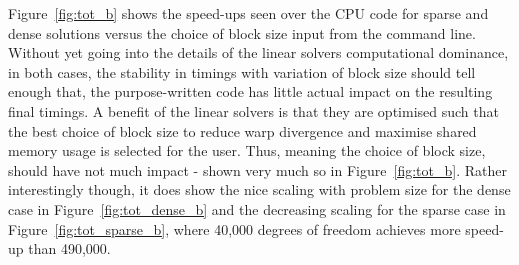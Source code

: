Figure~\ref{fig:tot_b} shows the speed-ups seen over the CPU code for sparse and dense solutions versus the choice of block size input from the command line. Without yet going into the details of the linear solvers computational dominance, in both cases, the stability in timings with variation of block size should tell enough that, the purpose-written code has little actual impact on the resulting final timings. A benefit of the linear solvers is that they are optimised such that the best choice of block size to reduce warp divergence and maximise shared memory usage is selected for the user. Thus, meaning the choice of block size, should have not much impact - shown very much so in Figure~\ref{fig:tot_b}. Rather interestingly though, it does show the nice scaling with problem size for the dense case in Figure~\ref{fig:tot_dense_b} and the decreasing scaling for the sparse case in Figure~\ref{fig:tot_sparse_b}, where 40,000 degrees of freedom achieves more speed-up than 490,000.

